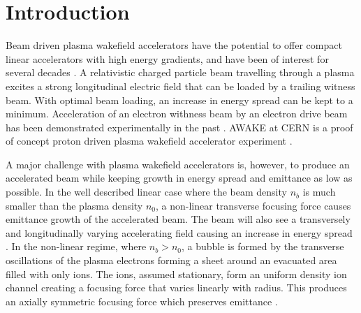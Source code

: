 \documentclass[aps,prstab,reprint,amsmath,amssymb,groupedaddress]{revtex4-1}
\begin{document}
\section[\label{S:I}]{Introduction}

Beam driven plasma wakefield accelerators have the potential to offer compact linear accelerators with high energy
gradients, and have been of interest for several decades \cite{chen:1985}. A relativistic charged particle beam
travelling through a plasma excites a strong longitudinal electric field that can be loaded by a trailing witness beam.
With optimal beam loading, an increase in energy spread can be kept to a minimum. Acceleration of an electron withness
beam by an electron drive beam has been demonstrated experimentally in the past
\cite{rosenzweig:1988, blumenfeld:2007, kallos:2008}. AWAKE at CERN is a proof of concept proton driven plasma wakefield
accelerator experiment \cite{awake_collaboration:2014}.

A major challenge with plasma wakefield accelerators is, however, to produce an accelerated beam while keeping growth in
energy spread and emittance as low as possible. In the well described linear case where the beam density $n_{b}$ is much
smaller than the plasma density $n_{0}$, a non-linear transverse focusing force causes emittance growth of the
accelerated beam. The beam will also see a transversely and longitudinally varying accelerating field causing an
increase in energy spread \cite{katsouleas:1987}. In the non-linear regime, where $n_{b} > n_{0}$, a bubble is formed by
the transverse oscillations of the plasma electrons forming a sheet around an evacuated area filled with only ions. The
ions, assumed stationary, form an uniform density ion channel creating a focusing force that varies linearly with
radius. This produces an axially symmetric focusing force which preserves emittance \cite{lu:2006-1, lu:2006}.
\end{document}
